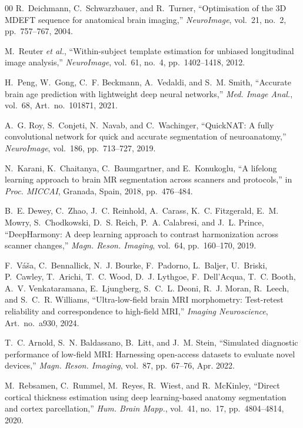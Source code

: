 \documentclass[12pt,a4paper]{article}
\begin{document}
\begin{thebibliography}{00}
R.~Deichmann, C.~Schwarzbauer, and R.~Turner,
``Optimisation of the 3D MDEFT sequence for anatomical brain imaging,''
\emph{NeuroImage}, vol.~21, no.~2, pp.~757--767, 2004.

M.~Reuter \emph{et al.},
``Within-subject template estimation for unbiased longitudinal image
analysis,''
\emph{NeuroImage}, vol.~61, no.~4, pp.~1402--1418, 2012.

H.~Peng, W.~Gong, C.~F. Beckmann, A.~Vedaldi, and S.~M. Smith,
``Accurate brain age prediction with lightweight deep neural networks,''
\emph{Med. Image Anal.}, vol.~68, Art.~no.~101871, 2021.

A.~G. Roy, S.~Conjeti, N.~Navab, and C.~Wachinger,
``QuickNAT: A fully convolutional network for quick and accurate
segmentation of neuroanatomy,''
\emph{NeuroImage}, vol.~186, pp.~713--727, 2019.

N.~Karani, K.~Chaitanya, C.~Baumgartner, and E.~Konukoglu,
``A lifelong learning approach to brain MR segmentation across scanners
and protocols,''
in \emph{Proc. MICCAI}, Granada, Spain, 2018, pp.~476--484.

B.~E. Dewey, C.~Zhao, J.~C. Reinhold, A.~Carass, K.~C. Fitzgerald,
E.~M. Mowry, S.~Chodkowski, D.~S. Reich, P.~A. Calabresi, and J.~L. Prince,
``DeepHarmony: A deep learning approach to contrast harmonization across
scanner changes,''
\emph{Magn. Reson. Imaging}, vol.~64, pp.~160--170, 2019.

F.~V{\'a}{\v s}a, C.~Bennallick, N.~J. Bourke, F.~Padorno,
L.~Baljer, U.~Briski, P.~Cawley, T.~Arichi, T.~C. Wood,
D.~J. Lythgoe, F.~Dell'Acqua, T.~C. Booth, A.~V. Venkataramana,
E.~Ljungberg, S.~C.~L. Deoni, R.~J. Moran, R.~Leech,
and S.~C.~R. Williams,
``Ultra-low-field brain MRI morphometry: Test-retest reliability and
correspondence to high-field MRI,''
\emph{Imaging Neuroscience}, Art.~no.~a930, 2024.

T.~C. Arnold, S.~N. Baldassano, B.~Litt, and J.~M. Stein,
``Simulated diagnostic performance of low-field MRI: Harnessing
open-access datasets to evaluate novel devices,''
\emph{Magn. Reson. Imaging}, vol.~87, pp.~67--76, Apr. 2022.

M.~Rebsamen, C.~Rummel, M.~Reyes, R.~Wiest, and R.~McKinley,
``Direct cortical thickness estimation using deep learning-based anatomy
segmentation and cortex parcellation,''
\emph{Hum. Brain Mapp.}, vol.~41, no.~17, pp.~4804--4814, 2020.


\end{thebibliography}
\end{document}
